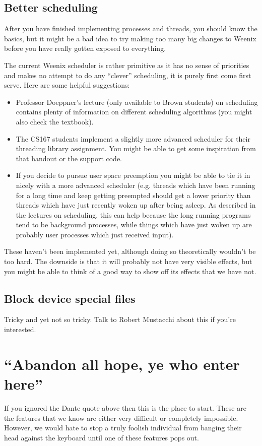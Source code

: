 \subsection{Better scheduling}
After you have finished implementing processes and threads, you should know the basics, but it might be a bad idea to try making too many big changes to Weenix before you have really gotten exposed to everything. %

The current Weenix scheduler is rather primitive as it has no sense of priorities and makes no attempt to do any ``clever'' scheduling, it is purely first come first serve. Here are some helpful suggestions:
\begin{itemize}
    \item Professor Doeppner's lecture (only available to Brown students) on scheduling contains plenty of information on different scheduling algorithms (you might also check the textbook).
    \item The CS167 students implement a slightly more advanced scheduler for their threading library assignment. You might be able to get some inspiration from that handout or the support code.
    \item If you decide to pursue user space preemption you might be able to tie it in nicely with a more advanced scheduler (e.g. threads which have been running for a long time and keep getting preempted should get a lower priority than threads which have just recently woken up after being asleep. As described in the lectures on scheduling, this can help because the long running programs tend to be background processes, while things which have just woken up are probably user processes which just received input). %
\end{itemize}

These haven't been implemented yet, although doing so theoretically wouldn't be too hard. The downside is that it will probably not have very visible effects, but you might be able to think of a good way to show off its effects that we have not.

\subsection{Block device special files}
Tricky and yet not so tricky. Talk to Robert Mustacchi about this if you're interested.

\section{``Abandon all hope, ye who enter here''}
If you ignored the Dante quote above then this is the place to start. These are the features that we know are either very difficult or completely impossible. However, we would hate to stop a truly foolish individual from banging their head against the keyboard until one of these features pops out.

